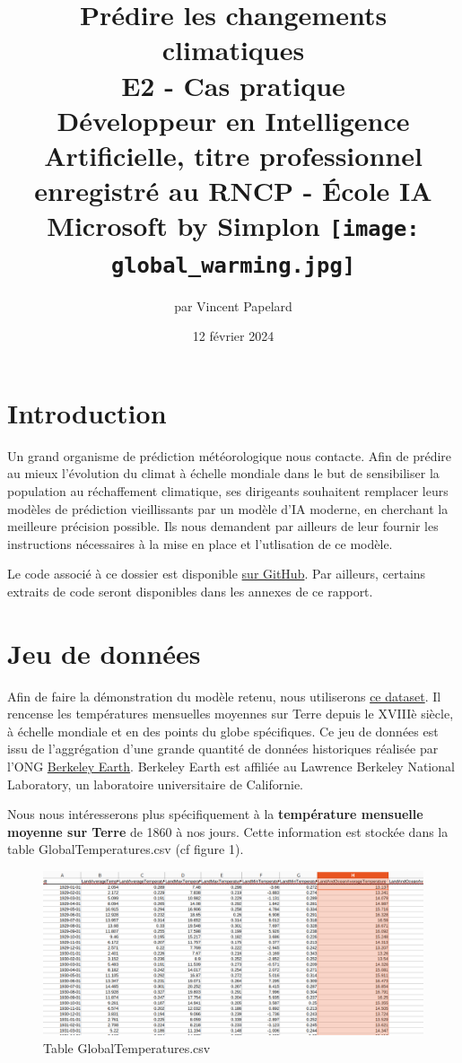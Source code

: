 \documentclass[french]{article}
\title{%
    \huge Prédire les changements climatiques  \\
    \bigskip
    \large E2 - Cas pratique \\ 
    Développeur en Intelligence Artificielle,
    titre professionnel enregistré au RNCP - École IA Microsoft by Simplon
    \vfill
    \texttt{[image: global\_warming.jpg]} %
    \vfill}
\date{12 février 2024}
\author{par Vincent Papelard}
\begin{document}
    \renewcommand{\contentsname}{Table des Matières}
    \maketitle
    \newpage
    \tableofcontents
    \newpage

    \section*{Introduction}

    Un grand organisme de prédiction météorologique nous contacte. Afin de prédire au mieux l'évolution du climat à échelle mondiale dans le but de sensibiliser la population au réchaffement climatique, ses dirigeants souhaitent remplacer leurs modèles de prédiction vieillissants par un modèle d'IA moderne, en cherchant la meilleure précision possible. Ils nous demandent par ailleurs de leur fournir les instructions nécessaires à la mise en place et l'utlisation de ce modèle.
    
    Le code associé à ce dossier est disponible \href{https://github.com/vinpap/predict_climate_change}{sur GitHub}. Par ailleurs, certains extraits de code seront disponibles dans les annexes de ce rapport.

    \section{Jeu de données}
    Afin de faire la démonstration du modèle retenu, nous utiliserons \href{https://www.kaggle.com/datasets/berkeleyearth/climate-change-earth-surface-temperature-data}{ce dataset}. Il rencense les températures mensuelles moyennes sur Terre depuis le XVIIIè siècle, à échelle mondiale et en des points du globe spécifiques. Ce jeu de données est issu de l'aggrégation d'une grande quantité de données historiques réalisée par l'ONG \href{http://berkeleyearth.org/about/}{Berkeley Earth}. Berkeley Earth est affiliée au Lawrence Berkeley National Laboratory, un laboratoire universitaire de Californie.
    
    Nous nous intéresserons  plus spécifiquement à la \textbf{température mensuelle moyenne sur Terre} de 1860 à nos jours. Cette information est stockée dans la table GlobalTemperatures.csv (cf figure 1).
    
    \begin{figure}[h]
        \includegraphics[width=12cm]{dataset}
        \centering
        \caption{Table GlobalTemperatures.csv}
        \centering
    \end{figure}
\end{document}
